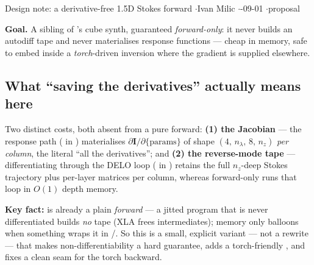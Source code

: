 


%
{Design note: a derivative-free 1.5D Stokes forward \quad$\cdot$\quad Ivan Milic \quad$\cdot$-09-01 \quad$\cdot$\quad proposal}

\textbf{Goal.} A sibling of 's cube synth, guaranteed \emph{forward-only}: it never builds an
autodiff tape and never materialises response functions --- cheap in memory, safe to embed inside a
\emph{torch}-driven inversion where the gradient is supplied elsewhere.

\subsection*{What ``saving the derivatives'' actually means here}
Two distinct costs, both absent from a pure forward: \textbf{(1) the Jacobian} --- the response path
( in ) materialises $\partial\mathbf{I}/\partial\{\text{params}\}$
of shape $(4,\,n_\lambda,\,8,\,n_z)$ \emph{per column}, the literal ``all the derivatives''; and \textbf{(2) the
reverse-mode tape} --- differentiating through the DELO loop ( in
) retains the full $n_z$-deep Stokes trajectory plus per-layer matrices per
column, whereas forward-only runs that loop in $O(1)$ depth memory.

\textbf{Key fact:}  is already a plain  \emph{forward} --- a jitted program that
is never differentiated builds \emph{no} tape (XLA frees intermediates); memory only balloons when something
wraps it in /. So this is a small, explicit variant --- not a rewrite --- that makes
non-differentiability a hard guarantee, adds a torch-friendly , and fixes a clean seam for the torch backward.


